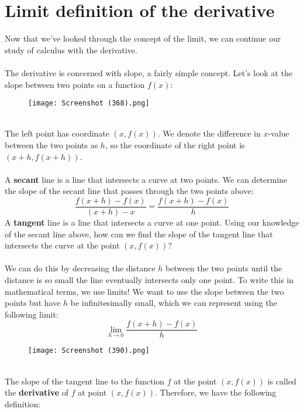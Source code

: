\documentclass[11pt]{scrartcl}
\begin{document}
\maketitle
\noindent
\section{Limit definition of the derivative}
\noindent
Now that we've looked through the concept of the limit, we can continue our study of calculus with the derivative. \\
\\
\noindent
The derivative is concerned with slope, a fairly simple concept. Let's look at the slope between two points on a function $f(x)$:
\begin{figure}[h!]
\centering
\texttt{[image: Screenshot (368).png]}
\end{figure}\\
\noindent
The left point has coordinate $(x, f(x))$. We denote the difference in $x$-value between the two points as $h$, so the coordinate of the right point is $(x+h, f(x+h))$. \\
\\
\noindent 
A \textbf{secant} line is a line that intersects a curve at two points. We can determine the slope of the secant line that passes through the two points above:
$$\frac{f(x+h)-f(x)}{(x+h)-x}=\frac{f(x+h)-f(x)}{h}$$
A \textbf{tangent} line is a line that intersects a curve at one point. Using our knowledge of the secant line above, how can we find the slope of the tangent line that intersects the curve at the point $(x,f(x))$? \\
\\
\noindent
We can do this by decreasing the distance $h$ between the two points until the distance is so small the line eventually intersects only one point. To write this  in mathematical terms, we use limits! We want to use the slope between the two points but have $h$ be infinitesimally small, which we can represent using the following limit: 
$$\lim_{h \to 0} \frac{f(x+h)-f(x)}{h}$$
\begin{figure}[h!]
\centering
\texttt{[image: Screenshot (390).png]}
\end{figure}\\
The slope of the tangent line to the function $f$ at the point $(x,f(x))$ is called the \textbf{derivative} of $f$ at point $(x,f(x))$. Therefore, we have the following definition: \\
\\
\end{document}
